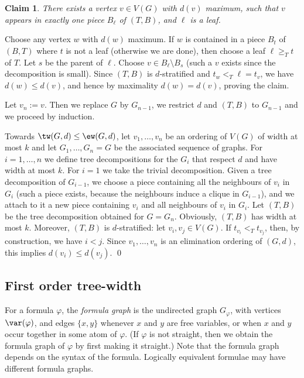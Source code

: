\documentclass{LMCS}
\newtheorem{clam}{Claim}
\newcommand{\gfi}{G_{\varphi}}
\renewcommand{\phi}{\varphi}
\begin{document}
\begin{clam}\label{claim:ex x d-max}
There exists a vertex $v\in V(G)$ with $d(v)$ maximum, 
such that $v$ appears in exactly one piece $B_{\ell}$ of $(T,B)$, 
and $\ell$ is a leaf. 
\end{clam}

\proof
Choose any vertex $w$ with $d(w)$ maximum. 
If $w$ is contained in a piece $B_t$ of $(B,T)$ where $t$ is not a leaf 
(otherwise we are done), 
then choose a leaf $\ell\geq_Tt$ of $T$. 
Let $s$ be the parent of $\ell$. 
Choose $v\in B_{\ell}\setminus B_s$ 
(such a $v$ exists since the decomposition is small). 
Since $(T,B)$ is $d$-stratified and $t_w<_T\ell=t_v$, we have 
$d(w)\leq d(v)$, and hence by maximality $d(w)=d(v)$, proving the claim. 
\cqed

Let $v_n:=v$. 
Then we replace $G$ by $G_{n-1}$, 
we restrict $d$ and $(T,B)$ to $G_{n-1}$ and we proceed by induction. 

Towards $\tw(G,d)\leq\ew(G,d)$, let $v_1,\ldots,v_n$ be an ordering of $V(G)$ of width
at most $k$ and let $G_1,\ldots, G_n=G$ be the associated sequence of graphs. 
For $i=1,\ldots,n$ we define tree decompositions for the $G_i$ that respect $d$ and have 
width at most $k$. For $i=1$ we take the trivial decomposition. Given a tree decomposition
of $G_{i-1}$, we choose a piece containing all the neighbours of $v_i$ in $G_{i}$ 
(such a piece exists, because the neighbours induce a clique in $G_{i-1}$), 
and we attach to it a new piece containing $v_i$ and all neighbours of $v_i$ in $G_i$. 
Let $(T,B)$ be the tree decomposition obtained for $G=G_n$. Obviously,
$(T,B)$ has width at most $k$. Moreover, $(T,B)$ is $d$-stratified: let
$v_i,v_j\in V(G)$. If $t_{v_i}<_Tt_{v_j}$, then, by construction, we
have $i<j$. Since $v_1,\ldots,v_n$ is an elimination ordering of $(G,d)$, 
this implies $d(v_i)\leq d(v_j)$. 
\qed

\subsection{First order tree-width}

For a formula $\phi$, the \emph{formula graph} is the undirected graph $\gfi$,
with vertices $\var(\phi)$, and edges $\{x,y\}$ whenever $x$ and $y$ are free variables, or
when $x$ and $y$ occur together in some atom of $\phi$. 
(If $\phi$ is not straight, then we obtain the 
formula graph of $\phi$ by first making it straight.) 
Note that the formula graph depends on the
syntax of the formula. Logically equivalent formulae may have different formula graphs.
\end{document}
